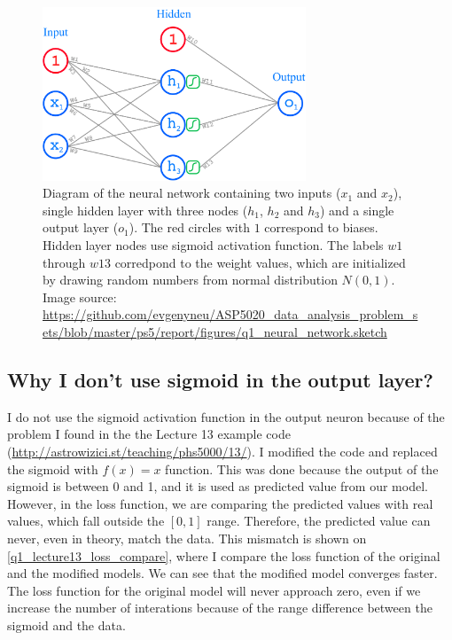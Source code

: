 \begin{figure}[H]
  \centering
  \includegraphics[width=0.7\textwidth]{figures/q1_neural_network.pdf}
  \caption{Diagram of the neural network containing two inputs ($x_1$ and $x_2$), single hidden layer with three nodes ($h_1$, $h_2$ and $h_3$) and a single output layer ($o_1$). The red circles with $1$ correspond to biases. Hidden layer nodes use sigmoid activation function. The labels $w1$ through $w13$ corredpond to the weight values, which are initialized by drawing random numbers from normal distribution $N(0, 1)$. Image source: \url{https://github.com/evgenyneu/ASP5020_data_analysis_problem_sets/blob/master/ps5/report/figures/q1_neural_network.sketch}}
  \label{q1_network_diagram}
\end{figure}


\subsection{Why I don't use sigmoid in the output layer?}

I do not use the sigmoid activation function in the output neuron because of the problem I found in the the Lecture 13 example code (\url{http://astrowizici.st/teaching/phs5000/13/}). I modified the code and replaced the sigmoid with $f(x) = x$ function. This was done because the output of the sigmoid is between 0 and 1, and it is used as predicted value from our model. However, in the loss function, we are comparing the predicted values with real values, which fall outside the $[0, 1]$ range. Therefore, the predicted value can never, even in theory, match the data. This mismatch is shown on \autoref{q1_lecture13_loss_compare}, where I compare the loss function of the original and the modified models. We can see that the modified model converges faster. The loss function for the original model will never approach zero, even if we increase the number of interations because of the range difference between the sigmoid and the data.

